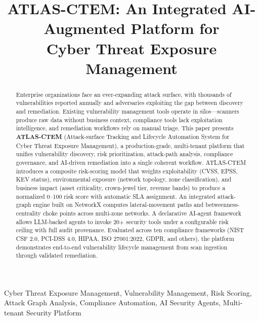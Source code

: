 \documentclass[conference]{IEEEtran}
\begin{document}
\title{ATLAS-CTEM: An Integrated AI-Augmented Platform for\\
Cyber Threat Exposure Management}

\author{
}

\maketitle

\begin{abstract}
Enterprise organizations face an ever-expanding attack surface, with thousands of vulnerabilities reported annually and adversaries exploiting the gap between discovery and remediation. Existing vulnerability management tools operate in silos—scanners produce raw data without business context, compliance tools lack exploitation intelligence, and remediation workflows rely on manual triage. This paper presents \textbf{ATLAS-CTEM} (Attack-surface Tracking and Lifecycle Automation System for Cyber Threat Exposure Management), a production-grade, multi-tenant platform that unifies vulnerability discovery, risk prioritization, attack-path analysis, compliance governance, and AI-driven remediation into a single coherent workflow. ATLAS-CTEM introduces a composite risk-scoring model that weights exploitability (CVSS, EPSS, KEV status), environmental exposure (network topology, zone classification), and business impact (asset criticality, crown-jewel tier, revenue bands) to produce a normalized 0–100 risk score with automatic SLA assignment. An integrated attack-graph engine built on NetworkX computes lateral-movement paths and betweenness-centrality choke points across multi-zone networks. A declarative AI-agent framework allows LLM-backed agents to invoke 20+ security tools under a configurable risk ceiling with full audit provenance. Evaluated across ten compliance frameworks (NIST CSF 2.0, PCI-DSS 4.0, HIPAA, ISO 27001:2022, GDPR, and others), the platform demonstrates end-to-end vulnerability lifecycle management from scan ingestion through validated remediation.
\end{abstract}

\begin{IEEEkeywords}
Cyber Threat Exposure Management, Vulnerability Management, Risk Scoring, Attack Graph Analysis, Compliance Automation, AI Security Agents, Multi-tenant Security Platform
\end{IEEEkeywords}
\end{document}
